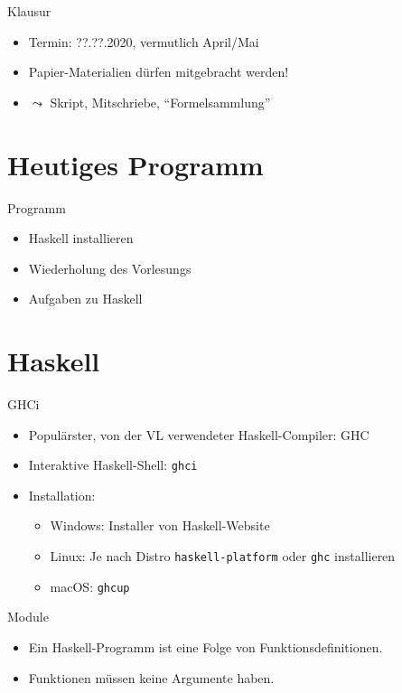 \documentclass{beamer}
\begin{document}
\begin{frame}{Klausur}
	\begin{itemize}
		\item Termin: ??.??.2020, vermutlich April/Mai
		\item Papier-Materialien dürfen mitgebracht werden!
		\item $\leadsto$ Skript, Mitschriebe, \enquote{Formelsammlung}
	\end{itemize}
\end{frame}

\section{Heutiges Programm}
\begin{frame}{Programm}
	\begin{itemize}
		\item Haskell installieren
		\item Wiederholung des Vorlesungs
		\item Aufgaben zu Haskell
	\end{itemize}
\end{frame}


\section{Haskell}

\begin{frame}[fragile]{GHCi}

	\begin{itemize}
		\item Populärster, von der VL verwendeter Haskell-Compiler: GHC
		\item Interaktive Haskell-Shell: \texttt{ghci}
		\item Installation:
		\begin{itemize}
			\item Windows: Installer von Haskell-Website
			\item Linux: Je nach Distro \texttt{haskell-platform} oder \texttt{ghc} installieren
			\item macOS: \texttt{ghcup}
		\end{itemize}
	\end{itemize}
\end{frame}

\begin{frame}{Module}

	\begin{itemize}
		\item Ein Haskell-Programm ist eine Folge von Funktionsdefinitionen.
		\item Funktionen müssen keine Argumente haben.
	\end{itemize}
\end{frame}
\end{document}
